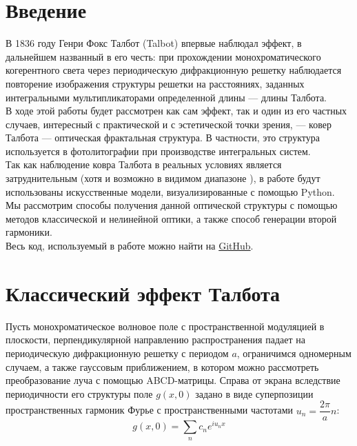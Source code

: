 \section{Введение}
В 1836 году Генри Фокс Талбот (Talbot) впервые наблюдал эффект, в дальнейшем названный в его честь: при прохождении монохроматического когерентного света через периодическую дифракционную решетку наблюдается повторение изображения структуры решетки на расстояниях, заданных интегральными мультипликаторами определенной длины --- длины Талбота.\\

В ходе этой работы будет рассмотрен как сам эффект, так и один из его частных случаев, интересный с практической и с эстетической точки зрения, --- ковер Талбота --- оптическая фрактальная структура. В частности, это структура используется в фотолитографии при производстве интегральных систем\cite{geinz2020}.\\

Так как наблюдение ковра Талбота в реальных условиях является затруднительным (хотя и возможно в видимом диапазоне \cite{ikonnikov2020}), в работе будут использованы искусственные модели, визуализированные с помощью Python. Мы рассмотрим способы получения данной оптической структуры с помощью методов классической и нелинейной оптики, а также способ генерации второй гармоники.\\

Весь код, используемый в работе можно найти на \href{https://github.com/aapetrakova/optics_4_sem.git}{GitHub}.\\





\section{Классический эффект Талбота}
Пусть монохроматическое волновое поле с пространственной модуляцией в плоскости, перпендикулярной направлению распространения падает на периодическую дифракционную решетку с периодом $a$, ограничимся одномерным случаем, а также гауссовым приближением, в котором можно рассмотреть преобразование луча с помощью ABCD-матрицы. Справа от экрана вследствие периодичности его структуры поле $g(x, 0)$ задано в виде суперпозиции пространственных гармоник Фурье с пространственными частотами $u_n = \dfrac{2\pi}{a}n$:
\begin{equation}
\label{1}
    g(x, 0) = \sum\limits_n c_n e^{iu_nx}
\end{equation}

